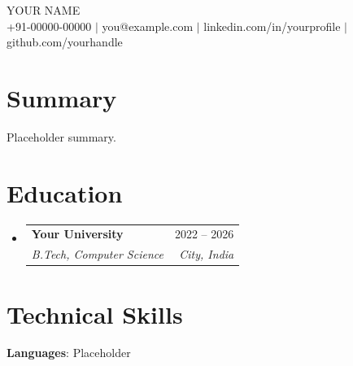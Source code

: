 \documentclass[letterpaper,10pt]{article}
\makeatletter
\newcommand{\resumeSubheading}[4]{%
  \item\begin{tabular*}{0.97\textwidth}[t]{l@{\extracolsep{\fill}}r}
    \textbf{#1} & #2 \\
    \textit{\small#3} & \textit{\small #4} \\
  \end{tabular*}\vspace{-7pt}}
\newcommand{\resumeSubHeadingListStart}{\begin{itemize}[leftmargin=0.15in,label={}]}
\newcommand{\resumeSubHeadingListEnd}{\end{itemize}}
\makeatother
\begin{document}
\begin{center}
  {\Huge \scshape YOUR NAME} \\ \vspace{3pt}
  \small +91-00000-00000 $|$ you@example.com $|$ linkedin.com/in/yourprofile $|$ github.com/yourhandle
\end{center}

\section{Summary}
Placeholder summary.

\section{Education}
  \resumeSubHeadingListStart
    \resumeSubheading{Your University}{2022 -- 2026}{B.Tech, Computer Science}{City, India}
  \resumeSubHeadingListEnd

\section{Technical Skills}
 \begin{itemize}[leftmargin=0.15in,label={}]
  \small{\item{
     \textbf{Languages}{: Placeholder} \\
  }}
 \end{itemize}


\end{document}
